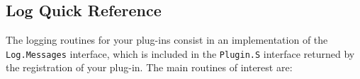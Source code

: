 
\subsection{Log Quick Reference}

The logging routines for your plug-ins consist in an implementation of
the \lstinline{Log.Messages} interface, which is included in the
\lstinline{Plugin.S} interface returned by the registration of your
plug-in. The main routines of interest are:

\newcommand{\ppcmd}[2]%
{{\small\tt {\bf #1}#2}}

\newcommand{\ppcmdprintf}[2]%
{{\small{\tt {\bf #1}#2} $<${\it options}$>$ {\tt "..."}}}

\newcommand{\logprintf}[2]{%
\item[\ppcmdprintf{#1}{#2}]%
\sscodeidxdef{Log}{Messages}{#1}\mbox{}\\%
}

\newcommand{\logprintfvariant}[2]{%
\item[\begin{tabular}{l@{ }l}%
\ppcmdprintf{#1}{}\\\ppcmdprintf{#2}{}%
\end{tabular}]%
\sscodeidx{Log}{Messages}{#1}\sscodeidx{Log}{Messages}{#2}\mbox{}\\%
}

\newcommand{\logroutine}[2]{%
\item[\ppcmd{#1}{#2}]%
\scodeidx{Log}{#1}\mbox{}\\%
}

